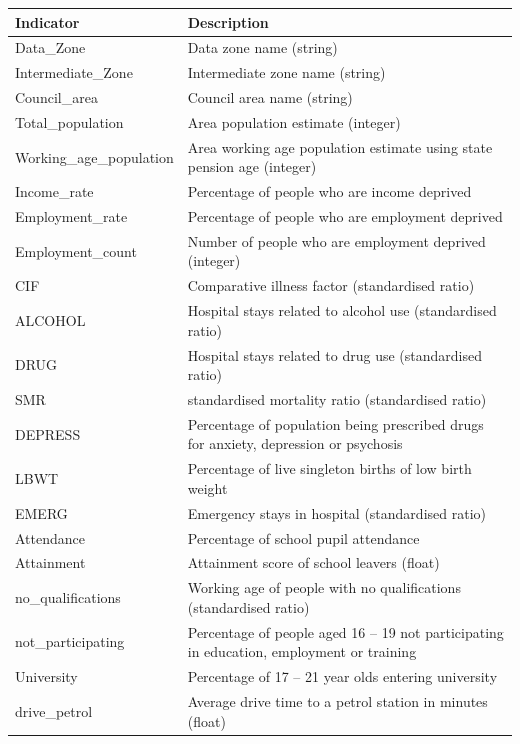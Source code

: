 \documentclass{thesis}
\begin{document}
\begin{table}[ht!]
    \centering
    \begin{tabular}{||l p{100mm}||} 
     \hline
     \textbf{Indicator} & \textbf{Description} \\ [0.5ex] 
     \hline\hline
     Data\_Zone & Data zone name (string) \\
     Intermediate\_Zone & Intermediate zone name (string) \\
     Council\_area & Council area name (string)  \\
     Total\_population & Area population estimate (integer) \\
     Working\_age\_population & Area working age population estimate using state pension age (integer) \\
     Income\_rate & Percentage of people who are income deprived \\
     Employment\_rate & Percentage of people who are employment deprived \\
     Employment\_count & Number of people who are employment deprived (integer) \\
     CIF & Comparative illness factor (standardised ratio\footnotemark) \\
     ALCOHOL & Hospital stays related to alcohol use (standardised ratio) \\
     DRUG & Hospital stays related to drug use (standardised ratio) \\
     SMR & standardised mortality ratio (standardised ratio) \\
     DEPRESS & Percentage of population being prescribed drugs for anxiety, depression or psychosis \\
     LBWT & Percentage of live singleton births of low birth weight \\
     EMERG & Emergency stays in hospital (standardised ratio) \\
     Attendance & Percentage of school pupil attendance \\
     Attainment & Attainment score of school leavers (float) \\
     no\_qualifications & Working age of people with no qualifications (standardised ratio) \\
     not\_participating & Percentage of people aged 16 -- 19 not participating in education, employment or training \\
     University & Percentage of 17 -- 21 year olds entering university \\
     drive\_petrol & Average drive time to a petrol station in minutes (float) \\

\end{tabular}
\end{table}
\end{document}
